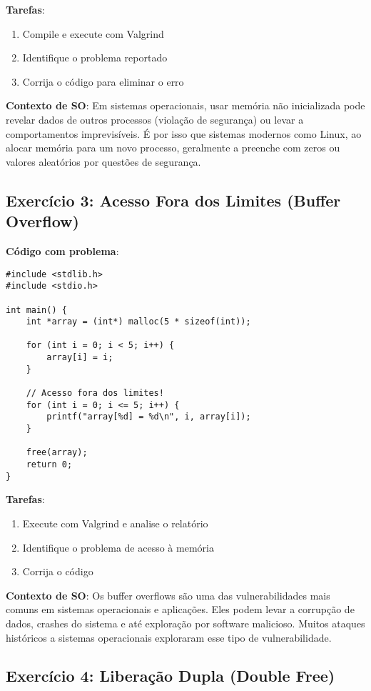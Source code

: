 \documentclass[11pt,a4paper]{article}
\begin{document}
\textbf{Tarefas}:
\begin{enumerate}
    \item Compile e execute com Valgrind
    \item Identifique o problema reportado
    \item Corrija o código para eliminar o erro
\end{enumerate}

\textbf{Contexto de SO}: Em sistemas operacionais, usar memória não inicializada pode revelar dados de outros processos (violação de segurança) ou levar a comportamentos imprevisíveis. É por isso que sistemas modernos como Linux, ao alocar memória para um novo processo, geralmente a preenche com zeros ou valores aleatórios por questões de segurança.

\subsection{Exercício 3: Acesso Fora dos Limites (Buffer Overflow)}

\textbf{Código com problema}:

\begin{lstlisting}
#include <stdlib.h>
#include <stdio.h>

int main() {
    int *array = (int*) malloc(5 * sizeof(int));
    
    for (int i = 0; i < 5; i++) {
        array[i] = i;
    }
    
    // Acesso fora dos limites!
    for (int i = 0; i <= 5; i++) {
        printf("array[%d] = %d\n", i, array[i]);
    }
    
    free(array);
    return 0;
}
\end{lstlisting}

\textbf{Tarefas}:
\begin{enumerate}
    \item Execute com Valgrind e analise o relatório
    \item Identifique o problema de acesso à memória
    \item Corrija o código
\end{enumerate}

\textbf{Contexto de SO}: Os buffer overflows são uma das vulnerabilidades mais comuns em sistemas operacionais e aplicações. Eles podem levar a corrupção de dados, crashes do sistema e até exploração por software malicioso. Muitos ataques históricos a sistemas operacionais exploraram esse tipo de vulnerabilidade.

\subsection{Exercício 4: Liberação Dupla (Double Free)}
\end{document}
